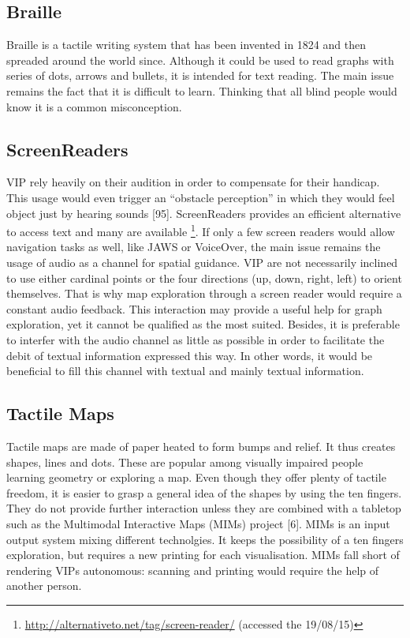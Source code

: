 \subsection{Braille}\label{braille}

Braille is a tactile writing system that has been invented in 1824 and
then spreaded around the world since. Although it could be used to read
graphs with series of dots, arrows and bullets, it is intended for text
reading. The main issue remains the fact that it is difficult to learn.
Thinking that all blind people would know it is a common misconception.

\subsection{ScreenReaders}\label{screenreaders}

VIP rely heavily on their audition in order to compensate for their
handicap. This usage would even trigger an ``obstacle perception'' in
which they would feel object just by hearing sounds {[}95{]}.
ScreenReaders provides an efficient alternative to access text and many
are available \footnote{\url{http://alternativeto.net/tag/screen-reader/}
  (accessed the 19/08/15)}. If only a few screen readers would allow
navigation tasks as well, like JAWS or VoiceOver, the main issue remains
the usage of audio as a channel for spatial guidance. VIP are not
necessarily inclined to use either cardinal points or the four
directions (up, down, right, left) to orient themselves. That is why map
exploration through a screen reader would require a constant audio
feedback. This interaction may provide a useful help for graph
exploration, yet it cannot be qualified as the most suited. Besides, it
is preferable to interfer with the audio channel as little as possible
in order to facilitate the debit of textual information expressed this
way. In other words, it would be beneficial to fill this channel with
textual and mainly textual information.

\subsection{Tactile Maps}\label{tactile-maps}

Tactile maps are made of paper heated to form bumps and relief. It thus
creates shapes, lines and dots. These are popular among visually
impaired people learning geometry or exploring a map. Even though they
offer plenty of tactile freedom, it is easier to grasp a general idea of
the shapes by using the ten fingers. They do not provide further
interaction unless they are combined with a tabletop such as the
Multimodal Interactive Maps (MIMs) project {[}6{]}. MIMs is an input
output system mixing different technolgies. It keeps the possibility of
a ten fingers exploration, but requires a new printing for each
visualisation. MIMs fall short of rendering VIPs autonomous: scanning
and printing would require the help of another person.

